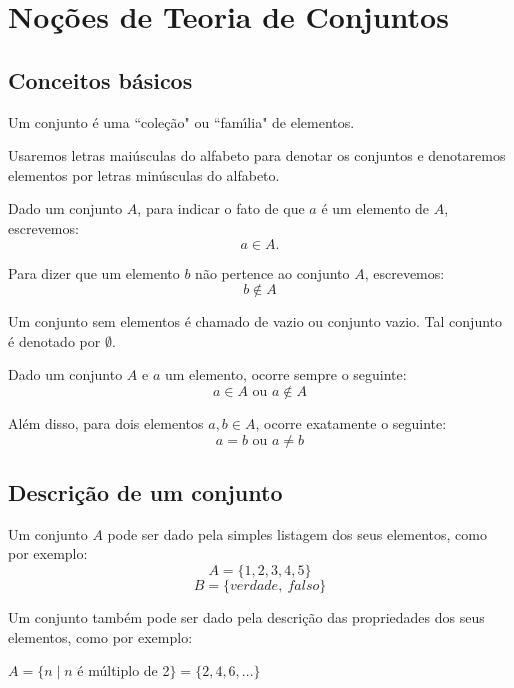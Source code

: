 \chapter{No{\c c}{\~o}es de Teoria de Conjuntos}
\section{Conceitos b{\'a}sicos}

Um conjunto {\'e} uma ``cole{\c c}{\~a}o" ou ``fam{\'\i}lia" de elementos.

Usaremos letras mai{\'u}sculas do alfabeto para denotar os conjuntos e denotaremos elementos por letras min{\'u}sculas do alfabeto.

Dado um conjunto $A$, para indicar o fato de que $a$ {\'e} um elemento de $A$, escrevemos:
\[
a \in A.
\]

Para dizer que um elemento $b$ n{\~a}o pertence ao conjunto $A$, escrevemos:
\[b \notin A\]

Um conjunto sem elementos {\'e} chamado de vazio ou conjunto vazio. Tal conjunto {\'e} denotado por $\emptyset$.

Dado um conjunto $A$ e $a$ um elemento, ocorre sempre o seguinte:
\[a \in A \mbox{ ou } a \notin A\]

Al{\'e}m disso, para dois elementos $a,b\in A$, ocorre exatamente o seguinte:
\[a=b \mbox{ ou } a\neq b\]

\section{Descri{\c c}{\~a}o de um conjunto}

Um conjunto $A$ pode ser dado pela simples listagem dos seus elementos, como por exemplo:
\[ A= \{1,2,3,4,5\}\]
\[B = \{verdade,\ falso\}\]

Um conjunto tamb{\'e}m pode ser dado pela descri{\c c}{\~a}o das propriedades dos seus elementos, como por exemplo:

$A=\{n \mid n$ {\'e} m{\'u}ltiplo de 2$\}=\{2,4,6,...\}$

